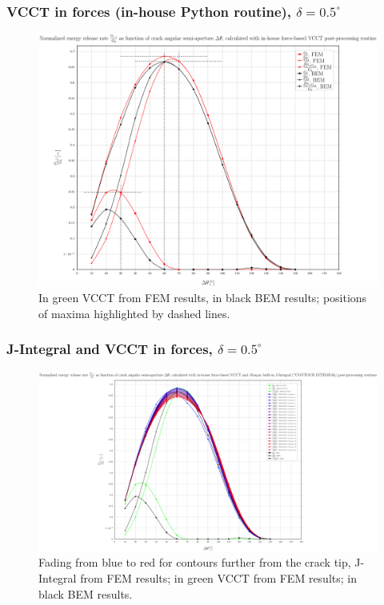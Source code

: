 \documentclass[first,firstsupp,lastsupp,handout,last,hyperref,table]{ETHclass}
\begin{document}
\begin{frame}
\frametitle{\small VCCT in forces (in-house Python routine), $\delta=0.5^{\circ}$}
\vspace{-0.5cm}
\centering
\captionsetup[figure]{font=scriptsize,labelfont=scriptsize}
\begin{figure}[!h]
\centering
\includegraphics[height=0.7\textheight]{2017-07-10_AbqRunSummary_SmallStrainD05_M-F-VCCT_Summary.pdf}
  \caption{\scriptsize In green VCCT from FEM results, in black BEM results; positions of maxima highlighted by dashed lines.}
  \label{fig:res1}
\end{figure}
\end{frame}

\begin{frame}
\frametitle{\small J-Integral and VCCT in forces, $\delta=0.5^{\circ}$}
\vspace{-0.5cm}
\centering
\captionsetup[figure]{font=scriptsize,labelfont=scriptsize}
\begin{figure}[!h]
\centering
\includegraphics[height=0.7\textheight]{2017-07-10_AbqRunSummary_SmallStrainD05_F-VCCT-JINT_Summary.pdf}
  \caption{\scriptsize Fading from blue to red for contours further from the crack tip, J-Integral from FEM results; in green VCCT from FEM results; in black BEM results.}
  \label{fig:res1}
\end{figure}
\end{frame}
\end{document}

